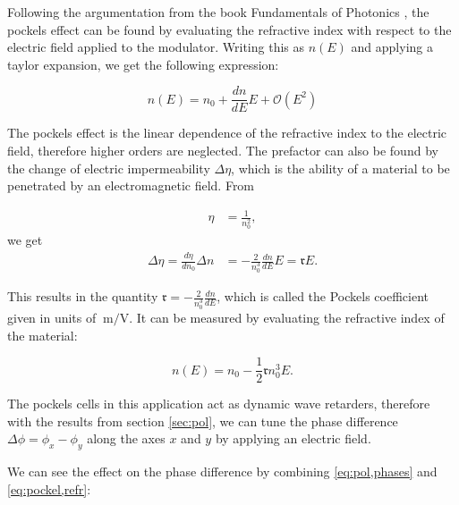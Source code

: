 Following the argumentation from the book Fundamentals of Photonics \cite{Saleh1991}, the pockels effect can be found by evaluating the refractive index with respect to the electric field applied to the modulator. Writing this as $n(E)$ and applying a taylor expansion, we get the following expression:

\begin{equation}
	n(E) = n_0 + \frac{dn}{dE} E + \mathcal{O}(E^2)
\end{equation}


The pockels effect is the linear dependence of the refractive index to the electric field, therefore higher orders are neglected. The prefactor can also be found by the change of electric impermeability $\Delta \eta$, which is the ability of a material to be penetrated by an electromagnetic field. From

\begin{align}
	\eta & = \frac{1}{n_0^2},
\end{align}
we get
\begin{align}
	\Delta \eta = \frac{d \eta}{dn_0} \Delta n & = -\frac{2}{n_0^3} \frac{dn}{dE} E = \mathfrak{r} E .
\end{align}
\label{eq:pockel,refr}

This results in the quantity $\mathfrak{r} = -\frac{2}{n_0^3} \frac{dn}{dE}$, which is called the Pockels coefficient given in units of $\SI{}{\meter\per\volt}$. It can be measured by evaluating the refractive index of the material:

\begin{equation}
	n(E) = n_0 - \frac{1}{2} \mathfrak{r} n_0^3 E .
\end{equation}

The pockels cells in this application act as dynamic wave retarders, therefore with the results from section \ref{sec:pol}, we can tune the phase difference $\Delta \phi = \phi_x - \phi_y$ along the axes $x$ and $y$ by applying an electric field.

We can see the effect on the phase difference by combining \ref{eq:pol,phases} and \ref{eq:pockel,refr}:

